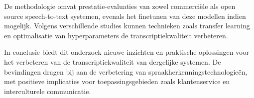 \documentclass[dutch,dit,thesis]{hogentreport}
\begin{document}
De methodologie omvat prestatie-evaluaties van zowel commerciële als open source speech-to-text systemen, evenals het finetunen van deze modellen indien mogelijk. Volgens verschillende studies kunnen technieken zoals transfer learning en optimalisatie van hyperparameters de transcriptiekwaliteit verbeteren.

In conclusie biedt dit onderzoek nieuwe inzichten en praktische oplossingen voor het verbeteren van de transcriptiekwaliteit van dergelijke systemen. De bevindingen dragen bij aan de verbetering van spraakherkenningstechnologieën, met positieve implicaties voor toepassingsgebieden zoals klantenservice en interculturele communicatie.



%


\backmatter{}

\setlength\bibitemsep{2pt} %
\printbibliography[heading=bibintoc]
\end{document}
